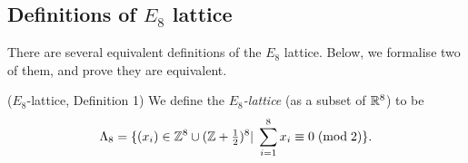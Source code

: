 \usepackage{expl3}

\usepackage{amsmath, amssymb, amsthm, amsfonts, mathtools}
\usepackage[unicode,colorlinks=true,linkcolor=blue,urlcolor=magenta, citecolor=blue]{hyperref}

\usepackage[warnings-off={mathtools-colon,mathtools-overbracket}]{unicode-math}

\usepackage[utf8]{inputenc}
\usepackage[capitalize,noabbrev]{cleveref}
\usepackage{autonum}
\usepackage[T1]{fontenc}

\usepackage{tikz}
\usepackage{tikz-cd}
\usepackage{graphicx} %


\subsection{Definitions of $E_8$ lattice}

There are several equivalent definitions of the $E_8$ lattice. Below, we formalise two of them, and prove they are equivalent.

\begin{definition}{($E_8$-lattice, Definition 1)}\label{E8-Set}\leanok
  We define the \emph{$E_8$-lattice} (as a subset of $\mathbb{R}^8$) to be
$$\Lambda_8=\{(x_i)\in\mathbb{Z}^8\cup(\mathbb{Z}+\textstyle\frac12\displaystyle )^8|\;\sum_{i=1}^8x_i\equiv 0\;(\mathrm{mod\;2})\}.$$
\end{definition}

